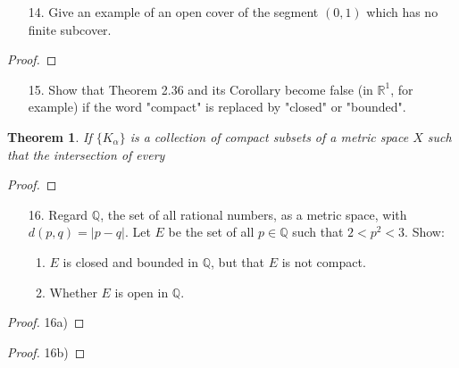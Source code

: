 \documentclass[10pt]{article}
\theoremstyle{definition}
\theoremstyle{plain}
\newtheorem{theorem}[equation]{Theorem}
\newcommand{\Q}{\mathbb{Q}}
\newcommand{\R}{\mathbb{R}}
\begin{document}
\begin{enumerate}
\item[14.] Give an example of an open cover of the segment $(0,1)$ which has no finite subcover.
\end{enumerate}

\begin{proof}

\end{proof}




\pagebreak





\begin{enumerate}
\item[15.] Show that Theorem 2.36 and its Corollary become false (in $\R^1$, for example) if the word "compact" is replaced by "closed" or "bounded".
\end{enumerate}
\setcounter{equation}{2}
\begin{theorem}
If $\{K_\alpha\}$ is a collection of compact subsets of a metric space $X$ such that the intersection of every
\end{theorem}
\begin{proof}

\end{proof}




\pagebreak



\begin{enumerate}
\item[16.] Regard $\Q$, the set of all rational numbers, as a metric space, with $d(p,q)=|p-q|$. Let $E$ be the set of all $p\in \Q$ such that $2<p^2<3$. Show:
\begin{enumerate}
\item $E$ is closed and bounded in $\Q$, but that $E$ is not compact.
\item Whether $E$ is open in $\Q$.
\end{enumerate}
\end{enumerate}

\begin{proof}
16a)
\end{proof}

\begin{proof}
16b)
\end{proof}



\pagebreak
\end{document}
